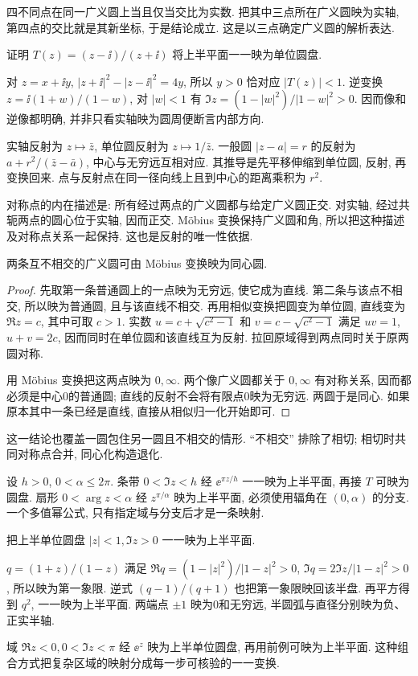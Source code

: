 四不同点在同一广义圆上当且仅当交比为实数. 把其中三点所在广义圆映为实轴, 第四点的交比就是其新坐标, 于是结论成立. 这是以三点确定广义圆的解析表达.
\begin{example}
证明 $T(z)=(z-\ii)/(z+\ii)$ 将上半平面一一映为单位圆盘.
\end{example}
\begin{solution}
对 $z=x+\ii y$, $|z+\ii|^2-|z-\ii|^2=4y$, 所以 $y>0$ 恰对应 $|T(z)|<1$. 逆变换 $z=\ii(1+w)/(1-w)$, 对 $|w|<1$ 有 $\Im z=(1-|w|^2)/|1-w|^2>0$. 因而像和逆像都明确, 并非只看实轴映为圆周便断言内部方向.
\end{solution}

实轴反射为 $z\mapsto\bar z$, 单位圆反射为 $z\mapsto1/\bar z$. 一般圆 $|z-a|=r$ 的反射为 $a+r^2/(\bar z-\bar a)$, 中心与无穷远互相对应. 其推导是先平移伸缩到单位圆, 反射, 再变换回来. 点与反射点在同一径向线上且到中心的距离乘积为 $r^2$.

对称点的内在描述是: 所有经过两点的广义圆都与给定广义圆正交. 对实轴, 经过共轭两点的圆心位于实轴, 因而正交. Möbius 变换保持广义圆和角, 所以把这种描述及对称点关系一起保持. 这也是反射的唯一性依据.
\begin{proposition}
两条互不相交的广义圆可由 Möbius 变换映为同心圆.
\end{proposition}
\begin{proof}
先取第一条普通圆上的一点映为无穷远, 使它成为直线. 第二条与该点不相交, 所以映为普通圆, 且与该直线不相交. 再用相似变换把圆变为单位圆, 直线变为 $\Re z=c$, 其中可取 $c>1$. 实数 $u=c+\sqrt{c^2-1}$ 和 $v=c-\sqrt{c^2-1}$ 满足 $uv=1$, $u+v=2c$, 因而同时在单位圆和该直线互为反射. 拉回原域得到两点同时关于原两圆对称.

用 Möbius 变换把这两点映为 $0,\infty$. 两个像广义圆都关于 $0,\infty$ 有对称关系, 因而都必须是中心0的普通圆; 直线的反射不会将有限点0映为无穷远. 两圆于是同心. 如果原本其中一条已经是直线, 直接从相似归一化开始即可.
\end{proof}
这一结论也覆盖一圆包住另一圆且不相交的情形. ``不相交'' 排除了相切; 相切时共同对称点合并, 同心化构造退化.

设 $h>0$, $0<\alpha\le2\pi$. 条带 $0<\Im z<h$ 经 $\ee^{\pi z/h}$ 一一映为上半平面, 再接 $T$ 可映为圆盘. 扇形 $0<\arg z<\alpha$ 经 $z^{\pi/\alpha}$ 映为上半平面, 必须使用辐角在 $(0,\alpha)$ 的分支. 一个多值幂公式, 只有指定域与分支后才是一条映射.
\begin{example}
把上半单位圆盘 $|z|<1,\Im z>0$ 一一映为上半平面.
\end{example}
\begin{solution}
$q=(1+z)/(1-z)$ 满足 $\Re q=(1-|z|^2)/|1-z|^2>0$, $\Im q=2\Im z/|1-z|^2>0$, 所以映为第一象限. 逆式 $(q-1)/(q+1)$ 也把第一象限映回该半盘. 再平方得到 $q^2$, 一一映为上半平面. 两端点 $\pm1$ 映为0和无穷远, 半圆弧与直径分别映为负、正实半轴.
\end{solution}
域 $\Re z<0,0<\Im z<\pi$ 经 $\ee^z$ 映为上半单位圆盘, 再用前例可映为上半平面. 这种组合方式把复杂区域的映射分成每一步可核验的一一变换.

